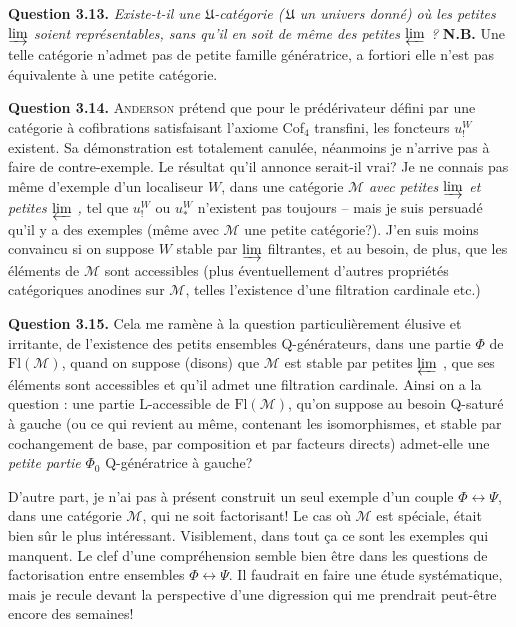 \documentclass[11pt]{article}
\newcommand{\printedpage}[1]{\marginpar{\footnotesize p.~#1}}
\newcommand{\msp}[1]{\marginpar{\footnotesize [#1]}}
\newcommand{\limind}{\varinjlim}
\newcommand{\limproj}{\varprojlim}
\newcommand{\Fl}{\mathrm{Fl}}
\begin{document}
\marginpar{! \textbar}\textbf{Question 3.13.} \textit{Existe-t-il une $\mathfrak{U}$-catégorie (\,$\mathfrak{U}$ un univers donné) où les petites $\limind$ soient représentables, sans qu'il en soit de même des petites $\limproj$ ?} \textbf{N.B.} Une telle catégorie n'admet pas de petite famille génératrice, a fortiori elle n'est pas équivalente à une petite catégorie.

\msp{page 48}
\textbf{Question 3.14.} \textsc{Anderson} prétend que pour le prédérivateur défini par une catégorie à cofibrations satisfaisant l'axiome Cof$_4$ transfini, les foncteurs $u_!^W$ existent. Sa démonstration est totalement canulée, néanmoins je n'arrive pas à faire de contre-exemple. Le résultat qu'il annonce serait-il vrai? Je ne connais pas même d'exemple d'un localiseur $W$, dans une catégorie $\mathcal{M}$ \textit{avec petites $\limind$ et petites $\limproj$ ,} tel que $u_!^W$ ou $u_*^W$ n'existent pas toujours -- mais je suis persuadé qu'il y a des exemples (même avec $\mathcal{M}$ une petite catégorie?). J'en suis moins convaincu si on suppose $W$ stable par $\limind$ filtrantes, et au besoin, de plus, que les éléments de $\mathcal{M}$ sont accessibles (plus éventuellement d'autres propriétés catégoriques anodines sur $\mathcal{M}$, telles l'existence d'une filtration
\printedpage{26}
\msp{page 49}
cardinale etc.)

\textbf{Question 3.15.} Cela me ramène à la question particulièrement élusive et irritante, de l'existence des petits ensembles Q-générateurs, dans une partie $\Phi$ de $\Fl(\mathcal{M})$, quand on suppose (disons) que $\mathcal{M}$ est stable par petites $\limproj$ , que ses éléments sont accessibles et qu'il admet une filtration cardinale. Ainsi on a la question : une partie L-accessible de $\Fl(\mathcal{M})$, qu'on suppose au besoin Q-saturé à gauche (ou ce qui revient au même, contenant les isomorphismes, et stable par cochangement de base, par composition et par facteurs directs) admet-elle une \textit{petite partie} $\Phi_0$ Q-génératrice à gauche? %

\marginpar{! \textbar}D'autre part, je n'ai pas à présent construit un seul exemple d'un couple $\Phi \longleftrightarrow \Psi$, dans une catégorie $\mathcal{M}$, qui ne soit factorisant! Le cas où $\mathcal{M}$ est spéciale, était bien sûr le plus intéressant. Visiblement, dans tout
\msp{page 50}
ça ce sont les exemples qui manquent. Le clef d'une compréhension semble bien être dans les questions de factorisation entre ensembles $\Phi \longleftrightarrow \Psi$. Il faudrait en faire une étude systématique, mais je recule devant la perspective d'une digression qui me prendrait peut-être encore des semaines! %
\end{document}

